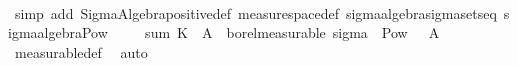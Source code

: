 \begin{isabellebody}
\ \ \ \ \isamarkupfalse%
\ {\isacharparenleft}{\kern0pt}simp\ add{\isacharcolon}{\kern0pt}\ Sigma{\isacharunderscore}{\kern0pt}Algebra{\isachardot}{\kern0pt}positive{\isacharunderscore}{\kern0pt}def\ measure{\isacharunderscore}{\kern0pt}space{\isacharunderscore}{\kern0pt}def\ sigma{\isacharunderscore}{\kern0pt}algebra{\isachardot}{\kern0pt}sigma{\isacharunderscore}{\kern0pt}sets{\isacharunderscore}{\kern0pt}eq\ sigma{\isacharunderscore}{\kern0pt}algebra{\isacharunderscore}{\kern0pt}Pow{\isacharparenright}{\kern0pt}\isanewline
\ \ \isamarkupfalse%
\ {\isachardoublequoteopen}{\isacharparenleft}{\kern0pt}{\isasymlambda}{\isasymomega}{\isachardot}{\kern0pt}\ sum\ {\isacharparenleft}{\kern0pt}K\ {\isasymomega}{\isacharparenright}{\kern0pt}\ A{\isacharprime}{\kern0pt}{\isacharparenright}{\kern0pt}\ {\isasymin}\ borel{\isacharunderscore}{\kern0pt}measurable\ {\isacharparenleft}{\kern0pt}sigma\ {\isasymOmega}\ {\isacharparenleft}{\kern0pt}Pow\ {\isasymOmega}\ \ A{\isacharprime}{\kern0pt}\isanewline
\ \ \ \ \isamarkupfalse%
\ measurable{\isacharunderscore}{\kern0pt}def\ \isamarkupfalse%
\ auto\isanewline
{}\isamarkupfalse%
%
\endisatagproof
{\isafoldproof}%
%
\isadelimproof
\isanewline
%
\endisadelimproof
%
\isadelimtheory
\isanewline
%
\endisadelimtheory
%
\isatagtheory
{}\isamarkupfalse%
%
\endisatagtheory
{\isafoldtheory}%
%
\isadelimtheory
%
\endisadelimtheory
%
\end{isabellebody}%
\endinput
